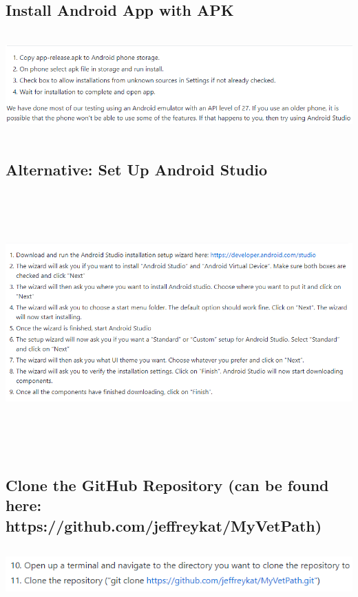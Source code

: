 \documentclass[onecolumn, draftclsnofoot,10pt, compsoc]{IEEEtran}
\begin{document}
 \subsection{Install Android App with APK}
  \begin{center}
\includegraphics[height=4cm, width=18cm]{AndroidAPPScript.png}
\end{center}
 
\subsection{Alternative: Set Up Android Studio}
 \begin{center}
\includegraphics[height=10cm, width=18cm]{setUpAndroidStudio.png}
\end{center}

\subsection{Clone the GitHub Repository (can be found here: https://github.com/jeffreykat/MyVetPath)}
 \begin{center}
\includegraphics[height=2cm, width=18cm]{getHubClone.png}
\end{center}
\end{document}
